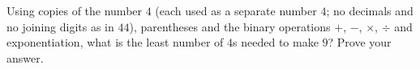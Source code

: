 Using copies of the number $4$ (each used as a separate number $4$; no decimals and no joining digits as in $44$), parentheses and the binary operations $+$, $-$, $\times$, $\div$ and exponentiation, what is the least number of $4$s needed to make $9$? Prove your answer.
